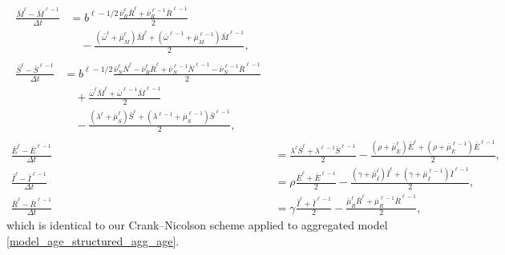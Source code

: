 \documentclass[USenglish]{article}
\begin{document}
\begin{subequations}
  \label{numerics_age_structured_agg_age}
  \begin{align}
    \begin{split}
      \frac{\bar{M}^{\ell} - \bar{M}^{\ell - 1}}{\Delta t}
      &= b^{\ell - 1 / 2}
      \frac{\bar{\nu}_R^{\ell} \bar{R}^{\ell}
        + \bar{\nu}_R^{\ell - 1} \bar{R}^{\ell - 1}}{2}
      \\ & \quad {}
      - \frac{
        (\bar{\omega}^{\ell} + \bar{\mu}_M^{\ell}) \bar{M}^{\ell}
        + (\bar{\omega}^{\ell - 1} + \bar{\mu}_M^{\ell - 1}) \bar{M}^{\ell - 1}
      }{2},
    \end{split}
    \\
    \begin{split}
      \frac{\bar{S}^{\ell} - \bar{S}^{\ell - 1}}{\Delta t}
      &= b^{\ell - 1 / 2}
      \frac{\bar{\nu}_N^{\ell} \bar{N}^{\ell}
        - \bar{\nu}_R^{\ell} \bar{R}^{\ell}
        + \bar{\nu}_N^{\ell - 1} \bar{N}^{\ell - 1}
        - \bar{\nu}_N^{\ell - 1} \bar{R}^{\ell - 1}}{2}
      \\ & \quad {}
      + \frac{\bar{\omega}^{\ell} \bar{M}^{\ell}
           + \bar{\omega}^{\ell - 1} \bar{M}^{\ell - 1}}{2}
      \\ & \quad {}
      - \frac{(\lambda^{\ell} + \bar{\mu}_S^{\ell}) \bar{S}^{\ell}
        + (\lambda^{\ell - 1} + \bar{\mu}_S^{\ell - 1}) \bar{S}^{\ell - 1}}{2},
    \end{split}
    \\
    \frac{\bar{E}^{\ell} - \bar{E}^{\ell - 1}}{\Delta t}
    &= \frac{\lambda^{\ell} \bar{S}^{\ell}
      + \lambda^{\ell - 1} \bar{S}^{\ell - 1}}{2}
    - \frac{(\rho + \bar{\mu}_E^{\ell}) \bar{E}^{\ell}
      + (\rho + \bar{\mu}_E^{\ell - 1}) \bar{E}^{\ell - 1}}{2},
    \\
    \frac{\bar{I}^{\ell} - \bar{I}^{\ell - 1}}{\Delta t}
    &= \rho \frac{\bar{E}^{\ell} + \bar{E}^{\ell - 1}}{2}
    - \frac{(\gamma + \bar{\mu}_I^{\ell}) \bar{I}^{\ell}
      + (\gamma + \bar{\mu}_I^{\ell - 1}) \bar{I}^{\ell - 1}}{2},
    \\
    \frac{\bar{R}^{\ell} - \bar{R}^{\ell - 1}}{\Delta t}
    &= \gamma \frac{\bar{I}^{\ell} + \bar{I}^{\ell - 1}}{2}
    - \frac{\bar{\mu}_R^{\ell} \bar{R}^{\ell}
      + \bar{\mu}_R^{\ell - 1} \bar{R}^{\ell - 1}}{2},
  \end{align}
\end{subequations}
which is identical to our Crank--Nicolson scheme applied to aggregated
model \eqref{model_age_structured_agg_age}.
\end{document}
